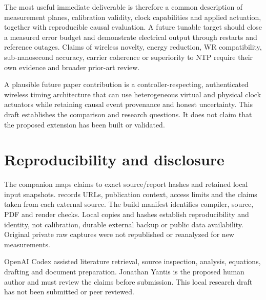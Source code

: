 \documentclass[11pt,letterpaper]{article}
\begin{document}
The most useful immediate deliverable is therefore a common description of measurement planes, calibration validity, clock capabilities and applied actuation, together with reproducible causal evaluation. A future tunable target should close a measured error budget and demonstrate electrical output through restarts and reference outages. Claims of wireless novelty, energy reduction, WR compatibility, sub-nanosecond accuracy, carrier coherence or superiority to NTP require their own evidence and broader prior-art review.

A plausible future paper contribution is a controller-respecting, authenticated wireless timing architecture that can use heterogeneous virtual and physical clock actuators while retaining causal event provenance and honest uncertainty. This draft establishes the comparison and research questions. It does not claim that the proposed extension has been built or validated.

\section*{Reproducibility and disclosure}
The companion  maps claims to exact source/report hashes and retained local input snapshots.  records URLs, publication context, access limits and the claims taken from each external source. The build manifest identifies compiler, source, PDF and render checks. Local copies and hashes establish reproducibility and identity, not calibration, durable external backup or public data availability. Original private raw captures were not republished or reanalyzed for new measurements.

OpenAI Codex assisted literature retrieval, source inspection, analysis, equations, drafting and document preparation. Jonathan Yantis is the proposed human author and must review the claims before submission. This local research draft has not been submitted or peer reviewed.
\end{document}
